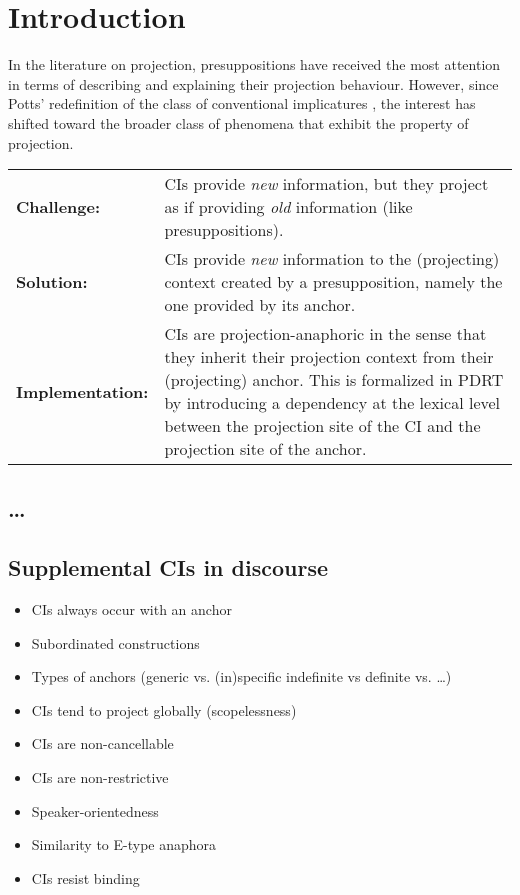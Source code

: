 \section{Introduction}\label{Introduction}

In the literature on projection, presuppositions have received the most
attention in terms of describing and explaining their projection behaviour.
However, since Potts' redefinition of the class of conventional implicatures
\citep{potts2003logic,potts2005logic}, the interest has shifted toward the
broader class of phenomena that exhibit the property of projection.

\bigskip
\begin{tabular}{p{} p{}}
  \textbf{Challenge:} & CIs provide \textit{new} information, but they
                        project as if providing \textit{old} information
                        (like presuppositions).\\

   \textbf{Solution:} & CIs provide \textit{new} information to the
                        (projecting) context created by a presupposition,
                        namely the one provided by its anchor.\\

\textbf{Implementation:} & CIs are projection-anaphoric in the sense that
                        they inherit their projection context from their
                        (projecting) anchor. This is formalized in PDRT
                        \citep{venhuizen2013iwcs} by introducing a dependency
                        at the lexical level between the projection site of
                        the CI and the projection site of the anchor.
\end{tabular}

\subsection{\ldots}

\subsection{Supplemental CIs in discourse}

\begin{itemize}
  \item CIs always occur with an anchor
  \item Subordinated constructions
  \item Types of anchors (generic vs. (in)specific indefinite vs definite
    vs. \ldots)
  \item CIs tend to project globally (scopelessness)
  \item CIs are non-cancellable
  \item CIs are non-restrictive
  \item Speaker-orientedness
  \item Similarity to E-type anaphora
  \item CIs resist binding
\end{itemize}

\citep{delgobbo2003appositives,nouwen2007appositives,
heringa2012appositional,schlenker2013supplements}


\citep{potts2005logic,amaral2007review,harris2009perspective,nouwen2014note}

